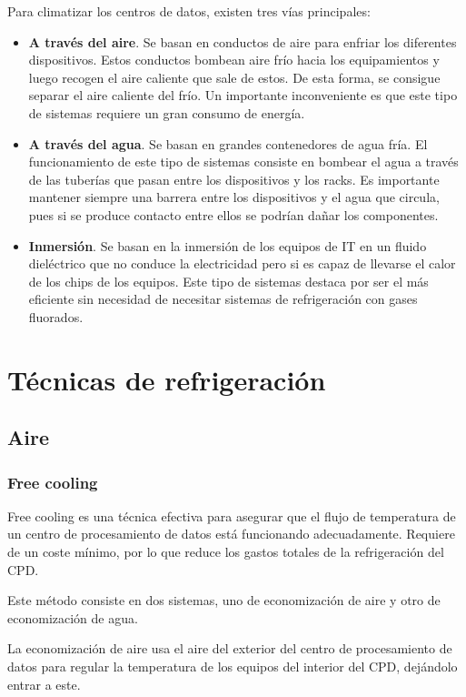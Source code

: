 Para climatizar los centros de datos, existen tres vías principales:

\begin{itemize}
    \item \textbf{A través del aire}. Se basan en conductos de aire para enfriar los diferentes dispositivos. Estos conductos bombean aire frío hacia los equipamientos y luego recogen el aire caliente que sale de estos. De esta forma, se consigue separar el aire caliente del frío. Un importante inconveniente es que este tipo de sistemas requiere un gran consumo de energía.
    \item \textbf{A través del agua}. Se basan en grandes contenedores de agua fría. El funcionamiento de este tipo de sistemas consiste en bombear el agua a través de las tuberías que pasan entre los dispositivos y los racks. Es importante mantener siempre una barrera entre los dispositivos y el agua que circula, pues si se produce contacto entre ellos se podrían dañar los componentes.
    \item \textbf{Inmersión}. Se basan en la inmersión de los equipos de IT en un fluido dieléctrico que no conduce la electricidad pero si es capaz de llevarse el calor de los chips de los equipos. Este tipo de sistemas destaca por ser el más eficiente sin necesidad de necesitar sistemas de refrigeración con gases fluorados.
\end{itemize}

\section{Técnicas de refrigeración}

\subsection{Aire}
\subsubsection{Free cooling}

Free cooling es una técnica efectiva para asegurar que el flujo de temperatura de un centro de procesamiento de datos está funcionando adecuadamente. Requiere de un coste mínimo, por lo que reduce los gastos totales de la refrigeración del CPD.

Este método consiste en dos sistemas, uno de economización de aire y otro de economización de agua.

La economización de aire usa el aire del exterior del centro de procesamiento de datos para regular la temperatura de los equipos del interior del CPD, dejándolo entrar a este.

